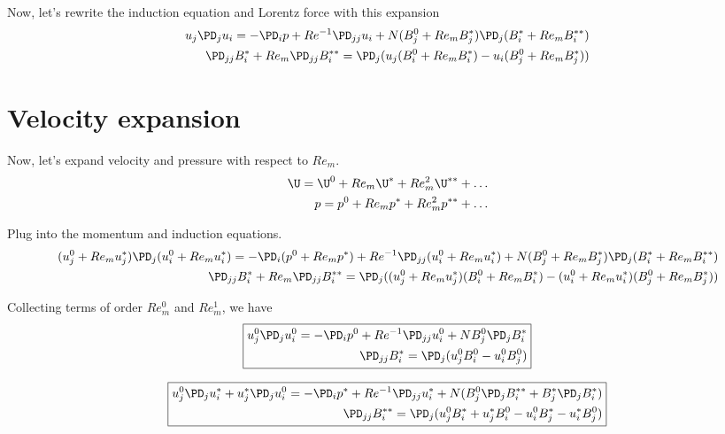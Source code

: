 \documentclass[11pt]{article}
\begin{document}
Now, let's rewrite the induction equation and Lorentz force with this expansion
\begin{equation}\begin{aligned}
u_j\PD_j u_i =-\PD_i p+ Re^{-1} \PD_{jj} u_i + N (B_j^0+Re_m B_j^*) \PD_j (B_i^* + Re_m B_i^{**}) \\
\PD_{jj} B_i^{*} + Re_m \PD_{jj} B_i^{**}  = \PD_j (u_j (B_i^{0} + Re_m B_i^{*}) - u_i (B_j^{0} + Re_m B_j^{*}) ) \\
\end{aligned} \end{equation}

\section{Velocity expansion}
Now, let's expand velocity and pressure with respect to $Re_m$.
\begin{equation}\begin{aligned}
	\U = \U^0 + Re_m \U^* + Re_m^2 \U^{**} + \hdots \\
	p = p^0 + Re_m p^* + Re_m^2 p^{**} + \hdots
\end{aligned} \end{equation}

Plug into the momentum and induction equations.
\begin{equation}\begin{aligned}
(u_j^0 + Re_m u_j^*)\PD_j (u_i^0 + Re_m u_i^*) =-\PD_i (p^0+Re_m p^*)+ Re^{-1} \PD_{jj} (u_i^0 + Re_m u_i^*) + N (B_j^0+Re_m B_j^*) \PD_j (B_i^* + Re_m B_i^{**}) \\
\PD_{jj} B_i^{*} + Re_m \PD_{jj} B_i^{**}  = \PD_j ((u_j^0 + Re_m u_j^*) (B_i^{0} + Re_m B_i^{*}) - (u_i^0 + Re_m u_i^*) (B_j^{0} + Re_m B_j^{*}) ) \\
\end{aligned} \end{equation}

Collecting terms of order $Re_m^0$ and $Re_m^1$, we have
\begin{equation}\boxed{\begin{aligned}
u_j^0\PD_j u_i^0 = -\PD_i p^0+ Re^{-1} \PD_{jj} u_i^0 + N B_j^0 \PD_j B_i^* \\
\PD_{jj} B_i^{*} = \PD_j (u_j^0 B_i^{0} - u_i^0 B_j^{0} ) \\
\end{aligned}}\end{equation}

\begin{equation}\boxed{\begin{aligned}
u_j^0\PD_j u_i^* + u_j^* \PD_j u_i^0 =-\PD_i p^*+ Re^{-1} \PD_{jj} u_i^* + N (B_j^0 \PD_j B_i^{**} + B_j^* \PD_j B_i^*)  \\
\PD_{jj} B_i^{**}  = \PD_j (u_j^0 B_i^{*} + u_j^* B_i^{0} - u_i^0 B_j^{*} - u_i^* B_j^{0} ) \\
\end{aligned}}\end{equation}
\end{document}
